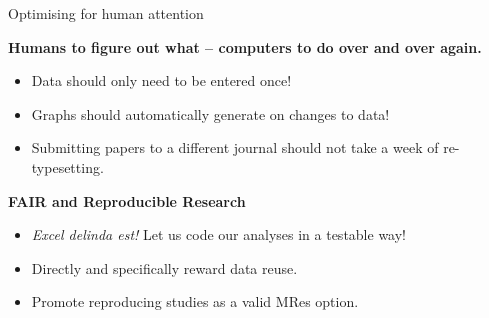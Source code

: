 \documentclass[aspectratio=169, 11pt]{beamer} %
\begin{document}

{%
\begin{frame}{Optimising for human attention}


\textbf{Humans to figure out what -- computers to do over and over again.}

\begin{itemize}
    \item Data should only need to be entered once!
    \item Graphs should automatically generate on changes to data! 
    \item Submitting papers to a different journal should not take a week of re-typesetting.
\end{itemize}




\textbf{FAIR and Reproducible Research}

\begin{itemize}
    \item \textit{Excel delinda est!} Let us code our analyses in a testable way! \parencite{Krugman2013-ju, Ross2020-yg, Bruford2020-tw}
    \item Directly and specifically reward data reuse.
    \item Promote reproducing studies as a valid MRes option. \parencite{Spring2018-kr}
\end{itemize}



\end{frame}}
\end{document}
